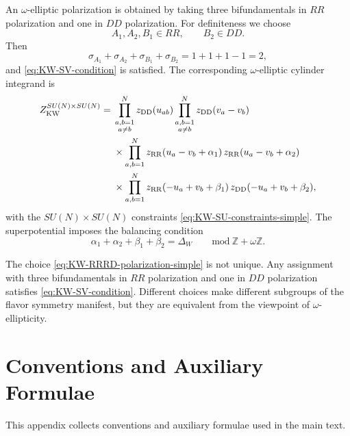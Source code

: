 \documentclass[11pt,a4paper]{article}
\numberwithin{equation}{section}
\theoremstyle{plain}
\theoremstyle{definition}
\theoremstyle{remark}
\begin{document}
An \(\omega\)-elliptic polarization is obtained by taking three bifundamentals in \(RR\)
polarization and one in \(DD\) polarization.  For definiteness we choose
\begin{equation}
A_1,A_2,B_1\in RR,
\qquad
B_2\in DD.
\label{eq:KW-RRRD-polarization-simple}
\end{equation}
Then
\begin{equation}
\sigma_{A_1}+\sigma_{A_2}+\sigma_{B_1}+\sigma_{B_2}
=
1+1+1-1=2,
\end{equation}
and \eqref{eq:KW-SV-condition} is satisfied.  The corresponding \(\omega\)-elliptic
cylinder integrand is
\begin{align}
Z_{\rm KW}^{SU(N)\times SU(N)}
={}&
\prod_{\substack{a,b=1\\a\neq b}}^{N}
z_{\rm DD}(u_{ab})
\prod_{\substack{a,b=1\\a\neq b}}^{N}
z_{\rm DD}(v_a-v_b)
\nonumber\\
&\times
\prod_{a,b=1}^{N}
z_{\rm RR}(u_a-v_b+\alpha_1)\,
z_{\rm RR}(u_a-v_b+\alpha_2)
\nonumber\\
&\times
\prod_{a,b=1}^{N}
z_{\rm RR}(-u_a+v_b+\beta_1)\,
z_{\rm DD}(-u_a+v_b+\beta_2),
\label{eq:KW-single-valued-integrand}
\end{align}
with the \(SU(N)\times SU(N)\) constraints
\eqref{eq:KW-SU-constraints-simple}.  The superpotential imposes the balancing
condition
\begin{equation}
\alpha_1+\alpha_2+\beta_1+\beta_2=\Delta_W
\qquad
\mathrm{mod}\ \mathbb Z+\omega\mathbb Z.
\label{eq:KW-balancing-simple}
\end{equation}

The choice \eqref{eq:KW-RRRD-polarization-simple} is not unique.  Any assignment
with three bifundamentals in \(RR\) polarization and one in \(DD\) polarization
satisfies \eqref{eq:KW-SV-condition}.  Different choices make different subgroups
of the flavor symmetry manifest, but they are equivalent from the viewpoint of
\(\omega\)-ellipticity.  


\appendix 



\section{Conventions and Auxiliary Formulae}\label{app:notation-conventions}

This appendix collects conventions and auxiliary formulae used in the main text.   

 
 
\end{document}
